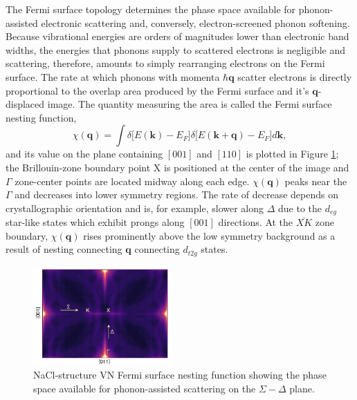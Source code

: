 \documentclass[twocolumn,showpacs,preprintnumbers,superscriptaddress,prb,floatfix,aps,10pt]{revtex4-1}
\renewcommand{\vec}[1]{\ensuremath{\mathbf{#1}}}
\newcommand*{\nesting}{\chi(\vec{q})}
\begin{document}
The Fermi surface topology determines the phase space available for phonon-assisted electronic scattering and, conversely, electron-screened phonon softening. Because vibrational energies are orders of magnitudes lower than electronic band widths, the energies that phonons supply to scattered electrons is negligible and scattering, therefore, amounts to simply rearranging electrons on the Fermi surface. The rate at which phonons with momenta $\hbar\vec{q}$ scatter electrons is directly proportional to the overlap area produced by the Fermi surface and it's $\vec{q}$-displaced image. The quantity measuring the area is called the Fermi surface nesting function, 
%
\begin{equation}
\label{eq:nesting}
\nesting = \int \delta\big[ E(\vec{k}) - E_F \big] \delta\big[ E(\vec{k + q}) - E_F \big] d\vec{k},
\end{equation}
%
and its value on the plane containing $\mathrm{[001]}$ and $\mathrm{[110]}$ is plotted in Figure \ref{fig:nesting_2d}; the Brillouin-zone boundary point $\mathrm{X}$ is positioned at the center of the image and $\Gamma$ zone-center points are located midway along each edge. $\nesting$ peaks near the $\Gamma$ and decreases into lower symmetry regions. The rate of decrease depends on crystallographic orientation and is, for example, slower along $\Delta$ due to the $d_{eg}$ star-like states which exhibit prongs along $\mathrm{[001]}$ directions. At the $\overline{XK}$ zone boundary, $\nesting$ rises  prominently above the low symmetry background as a result of nesting connecting $\vec{q}$ connecting $d_{t2g}$ states. 
%
\begin{figure}[h]
\includegraphics[width=0.47\textwidth]{Figure_3_nesting_2d.pdf}
\caption{\label{fig:nesting_2d} NaCl-structure VN Fermi surface nesting function showing the phase space available for phonon-assisted scattering on the $\Sigma-\Delta$ plane.}
\end{figure}
\end{document}
